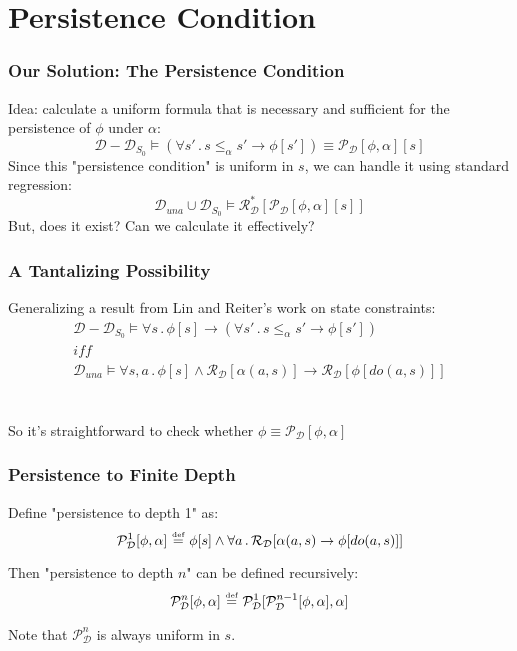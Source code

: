 \documentclass[compress]{beamer}
\newcommand{\isdef}{\hbox{$\stackrel{\mbox{\tiny def}}{=}$}}
\begin{document}
\section{Persistence Condition}

\begin{frame}
\frametitle{Our Solution: The Persistence Condition}
Idea: calculate a uniform formula that is necessary and sufficient for the persistence of $\phi$ under $\alpha$:
\begin{equation*}
  \mathcal{D}-\mathcal{D}_{S_0} \models \left(\forall s'\,.\,s \leq_{\alpha} s' \rightarrow \phi[s']\right) \equiv \mathcal{P}_{\mathcal{D}}[\phi,\alpha][s]
\end{equation*}
Since this "persistence condition" is uniform in $s$, we can handle it using
standard regression:
\begin{equation*}
  \mathcal{D}_{una} \cup \mathcal{D}_{S_0} \models \mathcal{R}^{*}_\mathcal{D}[\mathcal{P}_\mathcal{D}[\phi,\alpha][s]]
\end{equation*}
But, does it exist? Can we calculate it effectively?
\end{frame}

\begin{frame}
\frametitle{A Tantalizing Possibility}
Generalizing a result from Lin and Reiter's work on state constraints:
\begin{gather*}
\mathcal{D}-\mathcal{D}_{S_{0}}\models\forall s\,.\,\phi[s]\rightarrow\left(\forall s'\,.\, s\leq_{\alpha}s'\rightarrow\phi[s']\right)\\
\mathit{iff}\\
\mathcal{D}_{una}\models\forall s,a\,.\,\phi[s]\wedge\mathcal{R}_{\mathcal{D}}[\alpha(a,s)]\rightarrow\mathcal{R}_{\mathcal{D}}[\phi[do(a,s)]]
\end{gather*}
\ \\
\ \\
So it's straightforward to check whether $\phi \equiv \mathcal{P}_{\mathcal{D}}[\phi,\alpha]$
\end{frame}

\begin{frame}
\frametitle{Persistence to Finite Depth}
Define "persistence to depth 1" as:
\begin{equation*}
  \mathcal{P}^1_{\mathcal{D}}[\phi,\alpha]\,\,\isdef\,\,\phi[s] \wedge \forall a\,.\,\mathcal{R}_{\mathcal{D}}[\alpha(a,s)\rightarrow \phi[do(a,s)]]
\end{equation*}

Then "persistence to depth $n$" can be defined recursively:
\begin{equation*}
  \mathcal{P}^n_{\mathcal{D}}[\phi,\alpha]\,\,\isdef\,\,\mathcal{P}^1_{\mathcal{D}}[\mathcal{P}^{n-1}_{\mathcal{D}}[\phi,\alpha],\alpha]
\end{equation*}

Note that $\mathcal{P}^{n}_{\mathcal{D}}$ is always uniform in $s$.
\end{frame}
\end{document}
